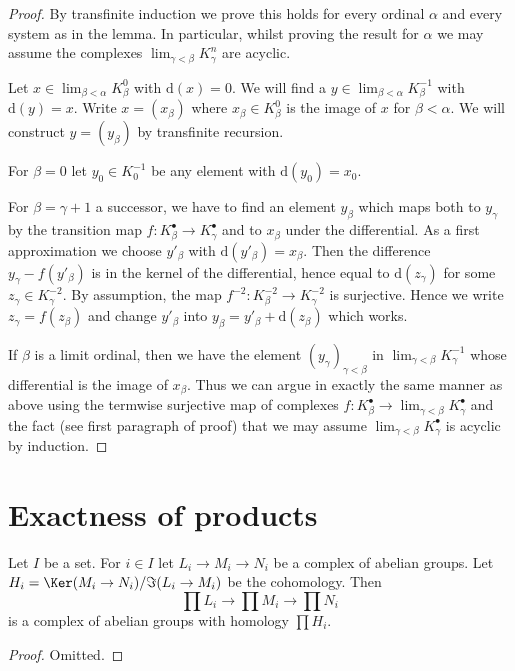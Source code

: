 \begin{proof}
By transfinite induction we prove this holds for every ordinal
$\alpha$ and every system as in the lemma. In particular, whilst
proving the result for $\alpha$ we may assume the complexes
$\lim_{\gamma < \beta} K^n_\gamma$ are acyclic.

\medskip\noindent
Let $x \in \lim_{\beta < \alpha} K^0_\beta$ with $\text{d}(x) = 0$.
We will find a $y \in \lim_{\beta < \alpha} K^{-1}_\beta$
with $\text{d}(y) = x$.
Write $x = (x_\beta)$ where $x_\beta \in K_\beta^0$ is the
image of $x$ for $\beta < \alpha$. We will construct $y = (y_\beta)$
by transfinite recursion.

\medskip\noindent
For $\beta = 0$ let $y_0 \in K_0^{-1}$
be any element with $\text{d}(y_0) = x_0$.

\medskip\noindent
For $\beta = \gamma + 1$ a successor, we have to find an element $y_\beta$
which maps both to $y_\gamma$ by the transition map
$f : K^\bullet_\beta \to K^\bullet_\gamma$ and to $x_\beta$ under the
differential. As a first approximation we choose $y'_\beta$ with
$\text{d}(y'_\beta) = x_\beta$. Then the difference $y_\gamma - f(y'_\beta)$
is in the kernel of the differential, hence equal to $\text{d}(z_\gamma)$
for some $z_\gamma \in K^{-2}_\gamma$.
By assumption, the map $f^{-2} : K^{-2}_\beta \to K^{-2}_\gamma$
is surjective. Hence we write $z_\gamma = f(z_\beta)$
and change $y'_\beta$ into $y_\beta = y'_\beta + \text{d}(z_\beta)$
which works.

\medskip\noindent
If $\beta$ is a limit ordinal, then we have the element
$(y_\gamma)_{\gamma < \beta}$ in $\lim_{\gamma < \beta} K^{-1}_\gamma$
whose differential is the image of $x_\beta$. Thus we can argue in exactly
the same manner as above using the termwise surjective map of complexes
$f : K_\beta^\bullet \to \lim_{\gamma < \beta} K_\gamma^\bullet$
and the fact (see first paragraph of proof) that we may assume
$\lim_{\gamma < \beta} K_\gamma^\bullet$ is acyclic by induction.
\end{proof}


\section{Exactness of products}
\label{section-product-exact}


\begin{lemma}
\label{lemma-product-abelian-groups-exact}
Let $I$ be a set. For $i \in I$ let $L_i \to M_i \to N_i$ be a complex
of abelian groups. Let $H_i = \Ker(M_i \to N_i)/\Im(L_i \to M_i)$
be the cohomology. Then
$$
\prod L_i \to \prod M_i \to \prod N_i
$$
is a complex of abelian groups with homology $\prod H_i$.
\end{lemma}

\begin{proof}
Omitted.
\end{proof}












